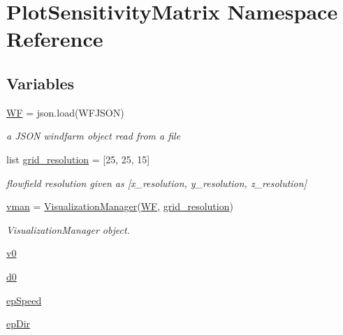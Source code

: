 \hypertarget{namespace_plot_sensitivity_matrix}{}\section{Plot\+Sensitivity\+Matrix Namespace Reference}
\label{namespace_plot_sensitivity_matrix}
\subsection*{Variables}
\begin{DoxyCompactItemize}
\item 
\mbox{\hyperlink{namespace_plot_sensitivity_matrix_ab3a981e10a7fb62fd0803b775cfc9c6e}{WF}} = json.\+load(W\+F\+J\+S\+ON)
\begin{DoxyCompactList}\small\item\em a J\+S\+ON windfarm object read from a file \end{DoxyCompactList}\item 
list \mbox{\hyperlink{namespace_plot_sensitivity_matrix_acceedf9e01ea99cebd60321cfe5f1563}{grid\+\_\+resolution}} = \mbox{[}25, 25, 15\mbox{]}
\begin{DoxyCompactList}\small\item\em flowfield resolution given as \mbox{[}x\+\_\+resolution, y\+\_\+resolution, z\+\_\+resolution\mbox{]} \end{DoxyCompactList}\item 
\mbox{\hyperlink{namespace_plot_sensitivity_matrix_a561c3184abc48dd7ca3ac05112482a82}{vman}} = \mbox{\hyperlink{classvisualization__manager___d_j_1_1_visualization_manager}{Visualization\+Manager}}(\mbox{\hyperlink{namespace_plot_sensitivity_matrix_ab3a981e10a7fb62fd0803b775cfc9c6e}{WF}}, \mbox{\hyperlink{namespace_plot_sensitivity_matrix_acceedf9e01ea99cebd60321cfe5f1563}{grid\+\_\+resolution}})
\begin{DoxyCompactList}\small\item\em Visualization\+Manager object. \end{DoxyCompactList}\item 
\mbox{\hyperlink{namespace_plot_sensitivity_matrix_a9c4c4d6959315c8f430d5e0b4b59945d}{v0}}
\item 
\mbox{\hyperlink{namespace_plot_sensitivity_matrix_ab6a17ada413ce5e414bbd5c3d6148868}{d0}}
\item 
\mbox{\hyperlink{namespace_plot_sensitivity_matrix_ab31b859e626585979a4ba8ba3c6f6c25}{ep\+Speed}}
\item 
\mbox{\hyperlink{namespace_plot_sensitivity_matrix_a7e5c62140098f225cf198ae020a1fb65}{ep\+Dir}}
\end{DoxyCompactItemize}



